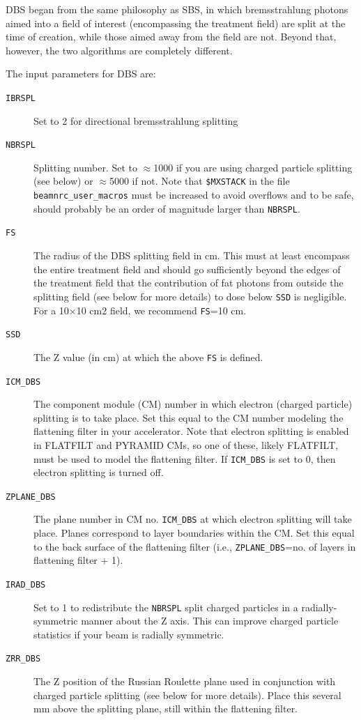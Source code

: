 \documentclass[12pt,twoside]{article}
\begin{document}
DBS began from the same philosophy as SBS, in which bremsstrahlung photons
aimed into a field of interest (encompassing the treatment field) are
split at the time of creation, while those aimed away from the field are
not.  Beyond that, however, the two algorithms are completely different.

The input parameters for DBS are:

\begin{description}
\item [{\tt IBRSPL}] Set to 2 for directional bremsstrahlung splitting
\item [{\tt NBRSPL}] Splitting number.
Set to $\approx$1000 if you are using charged particle splitting
(see below) or $\approx$5000 if not.  Note that {\tt \$MXSTACK} in
the file {\tt beamnrc\_user\_macros} must be increased to avoid
overflows and to be safe, should probably be an order of magnitude larger
than {\tt NBRSPL}.
\item [{\tt FS}]  The radius of the DBS splitting field in cm.  This
must at least encompass the entire treatment field and should go sufficiently
beyond the edges of the treatment field that the contribution of fat
photons from outside the splitting field (see below for
more details) to dose below {\tt SSD} is negligible.
For a 10$\times$10 cm$2$ field,
we recommend {\tt FS}=10 cm.
\item [{\tt SSD}]  The Z value (in cm)
at which the above {\tt FS} is defined.
\item [{\tt ICM\_DBS}] The component module (CM) number in which
electron (charged particle) splitting is to take place.  Set this equal to
the CM number modeling the flattening filter in your accelerator.
Note that electron splitting is enabled in FLATFILT and PYRAMID CMs, so
one of these, likely FLATFILT, must be used to model the flattening filter.
If {\tt ICM\_DBS} is set to 0, then electron splitting is turned off.
\item [{\tt ZPLANE\_DBS}] The plane number in CM no. {\tt ICM\_DBS} at which
electron splitting will take place.  Planes correspond to layer boundaries
within the CM.  Set this equal to the
back surface of the flattening filter (i.e., {\tt ZPLANE\_DBS}=no. of
layers in flattening filter + 1).
\item [{\tt IRAD\_DBS}] Set to 1 to redistribute the {\tt NBRSPL} split
charged particles in a radially-symmetric manner about the Z axis.  This
can improve charged particle statistics if your beam is radially
symmetric.
\item [{\tt ZRR\_DBS}] The Z position of the Russian Roulette plane
used in conjunction with charged particle splitting (see below for
more details).  Place this several mm above the splitting plane, still
within the flattening filter.


\end{description}
\end{document}
